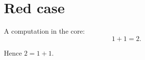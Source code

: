 \chapter{Red case}\label{c99}

A computation in the core:
\begin{equation}\label{c99.eq.eins}
  1 + 1 = 2.
\end{equation}
\begin{corollary}\label{c99.cor.zwei}
  Hence $2 = 1 + 1$.
\end{corollary}
